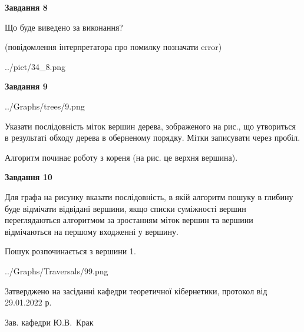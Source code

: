 \documentclass[12pt, ukrainian]{article}
\begin{document}
{\begin {large}
{\begin {center}\textbf{Завдання 8}\end {center}}\par
Що буде виведено за виконання?\par
 (повідомлення інтерпретатора про помилку позначати error)\par
\begin{center}
	{../pict/34_8.png}
\end{center}
\newpage

{\begin {center}\textbf{Завдання 9}\end {center}}\par

\begin{center}
	{../Graphs/trees/9.png}
\end{center}
Указати послідовність міток вершин дерева, зображеного на рис., що утвориться в результаті обходу дерева в оберненому порядку. Мітки записувати через пробіл.\par Алгоритм починає роботу з кореня (на рис. це верхня вершина).\par
\newpage

{\begin {center}\textbf{Завдання 10}\end {center}}\par
Для графа на рисунку вказати послідовність, в якій алгоритм пошуку в глибину буде відмічати відвідані вершини, якщо списки суміжності вершин переглядаються алгоритмом за зростанням міток вершин та вершини відмічаються на першому вход\-женні у вершину.\par
Пошук розпочинається з вершини 1.\par

\begin{center}
	{../Graphs/Traversals/99.png}
\end{center}\par
\newpage


\end {large}
}
{\smallskip \begin {small} Затверджено на засіданні кафедри теоретичної кібернетики, протокол  від   29.01.2022 р.\par\smallskip\smallskip
{\parbox {6.5 cm}{Зав. кафедри \dotfill Ю.В.~Крак}} \end{small}}
\end{document}
